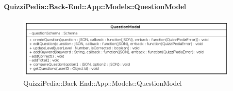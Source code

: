 \paragraph{QuizziPedia::Back-End::App::Models::QuestionModel}
\label{QuizziPedia::Back-End::App::Models::QuestionModel}
\begin{figure}[ht]
	\centering
	\includegraphics[scale=0.45]{UML/Classi/Back-End/QuizziPedia_Back-End_App_Models_questionModel.png}
	\caption{QuizziPedia::Back-End::App::Models::QuestionModel}
\end{figure}
\FloatBarrier
